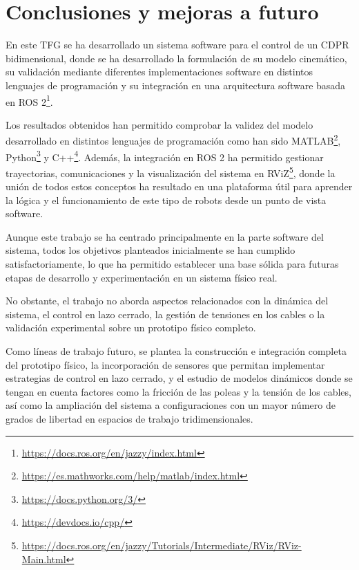 \chapter{Conclusiones y mejoras a futuro}
\label{cap:capitulo7}

En este TFG se ha desarrollado un sistema software para el control de un CDPR bidimensional, donde se ha desarrollado la formulación de su modelo cinemático, su validación mediante diferentes implementaciones software en distintos lenguajes de programación y su integración en una arquitectura software basada en ROS 2\footnote{\url{https://docs.ros.org/en/jazzy/index.html}}.

\vspace{0.25cm}

Los resultados obtenidos han permitido comprobar la validez del modelo desarrollado en distintos lenguajes de programación como han sido MATLAB\footnote{\url{https://es.mathworks.com/help/matlab/index.html}}, Python\footnote{\url{https://docs.python.org/3/}} y C++\footnote{\url{https://devdocs.io/cpp/}}. Además, la integración en ROS 2 ha permitido gestionar trayectorias, comunicaciones y la visualización del sistema en RViZ\footnote{\url{https://docs.ros.org/en/jazzy/Tutorials/Intermediate/RViz/RViz-Main.html}}, donde la unión de todos estos conceptos ha resultado en una plataforma útil para aprender la lógica y el funcionamiento de este tipo de robots desde un punto de vista software.

\vspace{0.25cm}

Aunque este trabajo se ha centrado principalmente en la parte software del sistema, todos los objetivos planteados inicialmente se han cumplido satisfactoriamente, lo que ha permitido establecer una base sólida para futuras etapas de desarrollo y experimentación en un sistema físico real.

\vspace{0.25cm}

No obstante, el trabajo no aborda aspectos relacionados con la dinámica del sistema, el control en lazo cerrado, la gestión de tensiones en los cables o la validación experimental sobre un prototipo físico completo.

\vspace{0.25cm}

Como líneas de trabajo futuro, se plantea la construcción e integración completa del prototipo físico, la incorporación de sensores que permitan implementar estrategias de control en lazo cerrado, y el estudio de modelos dinámicos donde se tengan en cuenta factores como la fricción de las poleas y la tensión de los cables, así como la ampliación del sistema a configuraciones con un mayor número de grados de libertad en espacios de trabajo tridimensionales.

\vspace{0.25cm}
